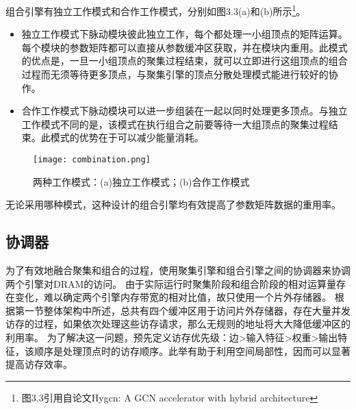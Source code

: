 组合引擎有独立工作模式和合作工作模式，分别如图3.3(a)和(b)所示\footnote{图3.3引用自论文Hygcn: A GCN accelerator with hybrid architec­ture}。
\begin{itemize}
    \item 独立工作模式下脉动模块彼此独立工作，每个都处理一小组顶点的矩阵运算。每个模块的参数矩阵都可以直接从参数缓冲区获取，并在模块内重用。此模式的优点是，一旦一小组顶点的聚集过程结束，就可以立即进行这组顶点的组合过程而无须等待更多顶点，与聚集引擎的顶点分散处理模式能进行较好的协作。
    \item 合作工作模式下脉动模块可以进一步组装在一起以同时处理更多顶点。与独立工作模式不同的是，该模式在执行组合之前要等待一大组顶点的聚集过程结束。此模式的优势在于可以减少能量消耗。
\end{itemize}

\begin{figure}[htb]
    \centering
    \texttt{[image: combination.png]}
    \caption{两种工作模式：(a)独立工作模式；(b)合作工作模式}
\end{figure}

无论采用哪种模式，这种设计的组合引擎均有效提高了参数矩阵数据的重用率。

\subsection{协调器}
为了有效地融合聚集和组合的过程，使用聚集引擎和组合引擎之间的协调器来协调两个引擎对DRAM的访问。
由于实际运行时聚集阶段和组合阶段的相对运算量存在变化，难以确定两个引擎内存带宽的相对比值，故只使用一个片外存储器。
根据第一节整体架构中所述，总共有四个缓冲区用于访问片外存储器，存在大量并发访存的过程，如果依次处理这些访存请求，那么无规则的地址将大大降低缓冲区的利用率。
为了解决这一问题，预先定义访存优先级：边>输入特征>权重>输出特征，该顺序是处理顶点时的访存顺序。此举有助于利用空间局部性，因而可以显著提高访存效率。